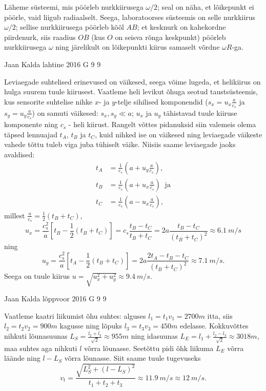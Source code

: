 \documentclass[11pt, twoside]{article}
\begin{document}
{{\ifSolution
Läheme süsteemi, mis pöörleb nurkkiirusega  $\omega/2$; seal on näha, et lõikepunkt ei pöörle, vaid liigub radiaalselt.
Seega, laboratoorses süsteemis on selle nurkkiirus $\omega/2$; sellise nurkkiirusega pöörleb kõõl $AB$; et kesknurk on kahekordne piirdenurk, siis 
raadius $OB$ (kus $O$ on seisva rõnga keskpunkt) pöörleb nurkkiirusega $\omega$ ning järelikult on lõikepunkti kiirus samaselt võrdne $\omega R$-ga.
\fi
}

{Jaan Kalda} %
{lahtine} %
{2016} %
{G 9} %
{9} %
{

\ifSolution
Leviaegade suhtelised erinevused on väikesed, seega võime lugeda, et helikiirus on hulga suurem tuule kiirusest.
Vaatleme heli levikut õhuga seotud taustsüsteemis, kus sensorite suhtelise nihke $x$- ja $y$-telje sihilised komponendid ($s_x=u_x\frac a{c_s}$ ja  
$s_y=u_y\frac a{c_s}$) on samuti väikesed: $s_x, s_y\ll a$; $u_x$ ja $u_y$ tähistavad tuule kiiruse komponente ning $c_s$ - heli kiirust.
Rangelt võttes pidanuksid siin valemeis olema täpsed lennuajad $t_A$, $t_B$ ja $t_C$, kuid nihked ise on väikesed ning leviaegade 
väikeste vahede tõttu tuleb viga juba tühiselt väike. Niisiis saame leviaegade jaoks avaldised:
\begin{align*}
t_A&=\frac 1{c_s}\left(a+u_y\frac a{c_s}\right),\\
t_B&=\frac 1{c_s}\left(a+u_x\frac a{c_s}\right)\;\; \mbox{ja}\\
t_C&=\frac 1{c_s}\left(a-u_x\frac a{c_s}\right),
\end{align*}
millest $ \frac a{c_s}=\frac 12(t_B+t_C)$, $$u_x=\frac {c_s^2}a\left[t_B-\frac 12(t_B+t_C)\right]=c_s\frac{t_B-t_C}{t_B+t_C}=2a\frac{t_B-t_C}{(t_B+t_C)^2}\approx \SI{6.1}{m/s}$$
ning 
$$u_y=\frac {c_s^2}a\left[t_A-\frac 12(t_B+t_C)\right]=2a\frac{2t_A-t_B-t_C}{(t_B+t_C)^2}\approx \SI{7.1}{m/s}.$$
Seega on tuule kiirus $u=\sqrt{u_x^2+u_y^2}\approx \SI{9.4}{m/s}$.
\fi
}

{Jaan Kalda} %
{lõppvoor} %
{2016} %
{G 9} %
{9} %
{

\ifSolution
Vaatleme kaatri liikumist õhu suhtes: alguses $l_1=t_1v_1=\SI{2700}m$ itta, siis $l_2=t_2v_2=\SI{900}m$ kagusse
ning lõpuks $l_3=t_3v_3=\SI{450}m$ edelasse. Kokkuvõttes nihkuti lõunasuunas $L_S=\frac{l_2+l_3}{\sqrt 2}\approx \SI{955}m$ ning idasuunas $L_E=l_1+\frac{l_2-l_3}{\sqrt 2}\approx \SI{3018}m$, maa suhtes aga nihkuti $l$ võrra lõunasse. Seetõttu pidi õhk liikuma $L_E$ võrra läände ning $l-L_S$ võrra lõunasse. Siit saame tuule tugevuseks 
$$v_t=\frac{\sqrt{L_S^2+(l-L_S)^2}}{t_1+t_2+t_3}\approx \SI{11.9}{m/s}\approx \SI{12}{m/s}.$$ 
\fi
}

}
\end{document}
